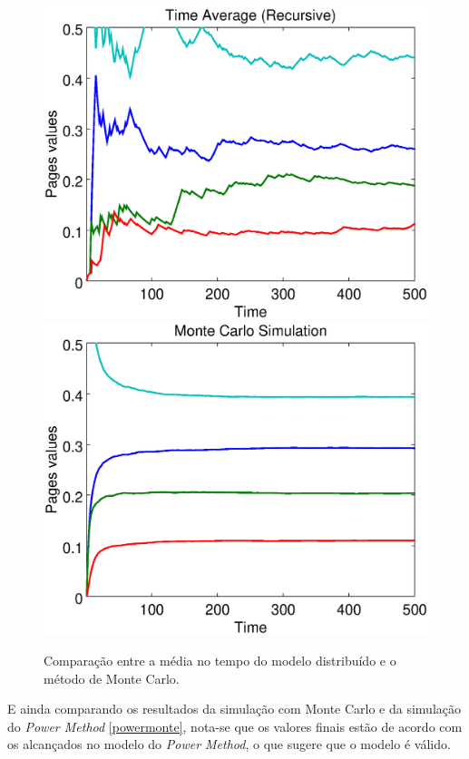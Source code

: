 \documentclass[a4paper]{report} %
\begin{document}
\
\begin{figure}[!htb]
	\centering
	\includegraphics[scale=0.3]{imagens/timerecursive}
	\hspace{0.1cm}
	\includegraphics[scale=0.3]{imagens/montecarlo}
	\caption{Comparação entre a média no tempo do modelo distribuído e o método de Monte Carlo.}
	\label{timemonte}
\end{figure}

E ainda comparando os resultados da simulação com Monte Carlo e da simulação do \textit{Power Method} \ref{powermonte}, nota-se que os valores finais estão de acordo com os alcançados no modelo do \textit{Power Method}, o que sugere que o modelo é válido.
\end{document}
